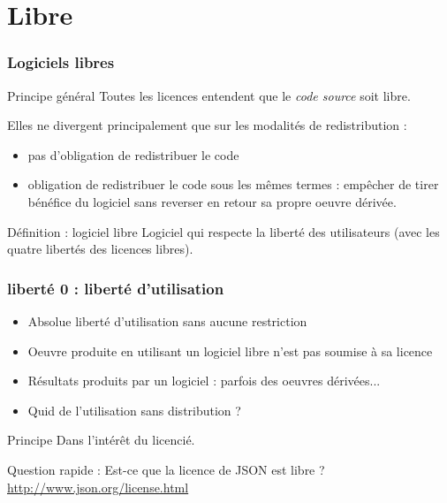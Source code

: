 \documentclass{beamer}
\begin{document}

\section{Libre}

\begin{frame}\frametitle{Logiciels libres}

  \begin{alertblock}{Principe général}
    Toutes les licences entendent que le \textit{code source} soit
    libre.
  \end{alertblock}
  Elles ne divergent principalement que sur les modalités de
  redistribution :
  \begin{itemize}
  \item pas d'obligation de redistribuer le code
  \item obligation de redistribuer le code sous les mêmes termes :
    empêcher de tirer bénéfice du logiciel sans reverser en retour sa
    propre oeuvre dérivée.
  \end{itemize}

  \begin{alertblock}{Définition : logiciel libre}
    Logiciel qui respecte la liberté des utilisateurs (avec les quatre
    libertés des licences libres).
  \end{alertblock}
  
\end{frame}


\begin{frame} \frametitle{liberté 0 : liberté d'utilisation}
  \begin{itemize}
  \item Absolue liberté d'utilisation sans aucune restriction
  \item Oeuvre produite en utilisant un logiciel libre n'est pas
    soumise à sa licence
  \item Résultats produits par un logiciel : parfois des oeuvres
    dérivées...
  \item Quid de l'utilisation sans distribution ?
  \end{itemize}

  \begin{alertblock}{Principe}
    Dans l'intérêt du licencié.
  \end{alertblock}
  
  Question rapide : Est-ce que la licence de JSON est libre ?
  \url{http://www.json.org/license.html}

\end{frame}
\end{document}
